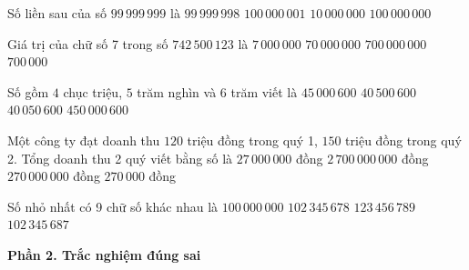 \begin{ex} %
Số liền sau của số $99\,999\,999$ là
\choice
{$99\,999\,998$}
{$100\,000\,001$}
{$10\,000\,000$}
{\True $100\,000\,000$}
\end{ex}

\begin{ex} %
Giá trị của chữ số 7 trong số $742\,500\,123$ là
\choice
{$7\,000\,000$}
{$70\,000\,000$}
{\True $700\,000\,000$}
{$700\,000$}
\end{ex}

\begin{ex} %
Số gồm $4$ chục triệu, $5$ trăm nghìn và $6$ trăm viết là
\choice
{$45\,000\,600$}
{\True $40\,500\,600$}
{$40\,050\,600$}
{$450\,000\,600$}
\end{ex}

\begin{ex} %
Một công ty đạt doanh thu $120$ triệu đồng trong quý 1, $150$ triệu đồng trong quý 2. Tổng doanh thu 2 quý viết bằng số là
\choice
{$27\,000\,000$ đồng}
{$2\,700\,000\,000$ đồng}
{\True $270\,000\,000$ đồng}
{$270\,000$ đồng}
\end{ex}

\begin{ex} %
Số nhỏ nhất có 9 chữ số khác nhau là
\choice
{$100\,000\,000$}
{\True $102\,345\,678$}
{$123\,456\,789$}
{$102\,345\,687$}
\end{ex}

\textbf{Phần 2. Trắc nghiệm đúng sai}

